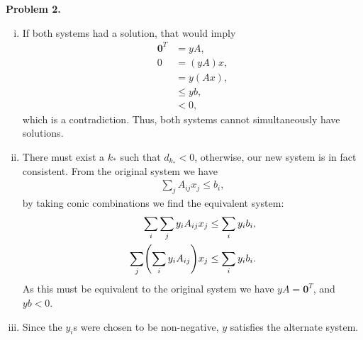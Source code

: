 \documentclass[11pt,a4paper]{article}
\let\originalleft\left
\let\originalright\right
\renewcommand{\left}{\mathopen{}\mathclose\bgroup\originalleft}
\renewcommand{\right}{\aftergroup\egroup\originalright}
\begin{document}
\textbf{Problem 2.}
\begin{enumerate}[i)]
	\item
	If both systems had a solution, that would imply
	\begin{align*}
		\mathbf{0}^T &= yA, \\
		0 &= (y A) x, \\
		&= y (A x), \\
		&\leq yb, \\
		&< 0,
	\end{align*}
	which is a contradiction. Thus, both systems cannot simultaneously have solutions.
	\item There must exist a $k_*$ such that $d_{k_*} < 0$, otherwise, our new system is in fact consistent. From the original system we have
	\begin{align*}
		\sum_j A_{ij} x_j \leq b_i,
	\end{align*}
	by taking conic combinations we find the equivalent system:
	\begin{align*}
		\sum_i \sum_j  y_i A_{ij} x_j &\leq \sum_i y_i b_i, \\
		\sum_j \left( \sum_i  y_i A_{ij} \right) x_j &\leq \sum_i y_i b_i.
	\end{align*}
	As this must be equivalent to the original system we have $yA = \mathbf{0}^T$, and $yb < 0$.
	\item Since the $y_i$s were chosen to be non-negative, $y$ satisfies the alternate system.
\end{enumerate}
\end{document}
